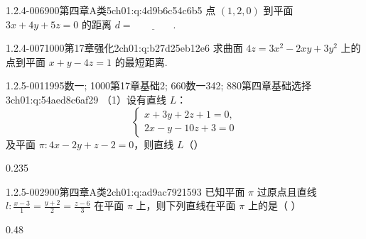 \begin{q}{1.2.4-006}{900第四章A类5}{ch01:q:4d9b6c54c6b5}
点 $(1,2,0)$ 到平面 $3x+4y+5z=0$ 的距离 $d=\underline{\hspace{4em}}$.
\end{q}

\begin{q}{1.2.4-007}{1000第17章强化2}{ch01:q:b27d25eb12e6}
求曲面 $4z=3x^2-2xy+3y^2$ 上的点到平面 $x+y-4z=1$ 的最短距离.
\end{q}

\par\addvspace{2.4ex}\noindent
\begin{minipage}{\linewidth}

\begin{q}{1.2.5-001}{1995数一; 1000第17章基础2; 660数一342; 880第四章基础选择3}{ch01:q:54aed8c6af29}
（1）设有直线 $L$：\[\begin{cases} x+3y+2z+1=0,\\ 2x-y-10z+3=0 \end{cases}\] 及平面 $\pi:4x-2y+z-2=0$，则直线 $L$（\quad）
\begin{opts}{0.235}
\hfill{}\hfill{}\hfill{}
\end{opts}
\end{q}
\end{minipage}


\begin{q}{1.2.5-002}{900第四章A类2}{ch01:q:ad9ac7921593}
已知平面 $\pi$ 过原点且直线 $l:\frac{x-3}{1}=\frac{y+2}{2}=\frac{z-6}{3}$ 在平面 $\pi$ 上，则下列直线在平面 $\pi$ 上的是（ ）
\begin{opts}{0.48}
\hfill{}\\[0.3ex]
\hfill{}
\end{opts}
\end{q}

